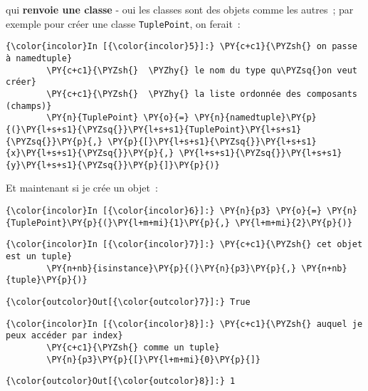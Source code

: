     qui \textbf{renvoie une classe} - oui les classes sont des objets comme
les autres~; par exemple pour créer une classe \texttt{TuplePoint}, on
ferait~:

    \begin{Verbatim}[commandchars=\\\{\}]
{\color{incolor}In [{\color{incolor}5}]:} \PY{c+c1}{\PYZsh{} on passe à namedtuple}
        \PY{c+c1}{\PYZsh{}  \PYZhy{} le nom du type qu\PYZsq{}on veut créer}
        \PY{c+c1}{\PYZsh{}  \PYZhy{} la liste ordonnée des composants (champs)}
        \PY{n}{TuplePoint} \PY{o}{=} \PY{n}{namedtuple}\PY{p}{(}\PY{l+s+s1}{\PYZsq{}}\PY{l+s+s1}{TuplePoint}\PY{l+s+s1}{\PYZsq{}}\PY{p}{,} \PY{p}{[}\PY{l+s+s1}{\PYZsq{}}\PY{l+s+s1}{x}\PY{l+s+s1}{\PYZsq{}}\PY{p}{,} \PY{l+s+s1}{\PYZsq{}}\PY{l+s+s1}{y}\PY{l+s+s1}{\PYZsq{}}\PY{p}{]}\PY{p}{)}
\end{Verbatim}


    Et maintenant si je crée un objet~:

    \begin{Verbatim}[commandchars=\\\{\}]
{\color{incolor}In [{\color{incolor}6}]:} \PY{n}{p3} \PY{o}{=} \PY{n}{TuplePoint}\PY{p}{(}\PY{l+m+mi}{1}\PY{p}{,} \PY{l+m+mi}{2}\PY{p}{)}
\end{Verbatim}


    \begin{Verbatim}[commandchars=\\\{\}]
{\color{incolor}In [{\color{incolor}7}]:} \PY{c+c1}{\PYZsh{} cet objet est un tuple}
        \PY{n+nb}{isinstance}\PY{p}{(}\PY{n}{p3}\PY{p}{,} \PY{n+nb}{tuple}\PY{p}{)}
\end{Verbatim}


\begin{Verbatim}[commandchars=\\\{\}]
{\color{outcolor}Out[{\color{outcolor}7}]:} True
\end{Verbatim}
            
    \begin{Verbatim}[commandchars=\\\{\}]
{\color{incolor}In [{\color{incolor}8}]:} \PY{c+c1}{\PYZsh{} auquel je peux accéder par index}
        \PY{c+c1}{\PYZsh{} comme un tuple}
        \PY{n}{p3}\PY{p}{[}\PY{l+m+mi}{0}\PY{p}{]}
\end{Verbatim}


\begin{Verbatim}[commandchars=\\\{\}]
{\color{outcolor}Out[{\color{outcolor}8}]:} 1
\end{Verbatim}
            
